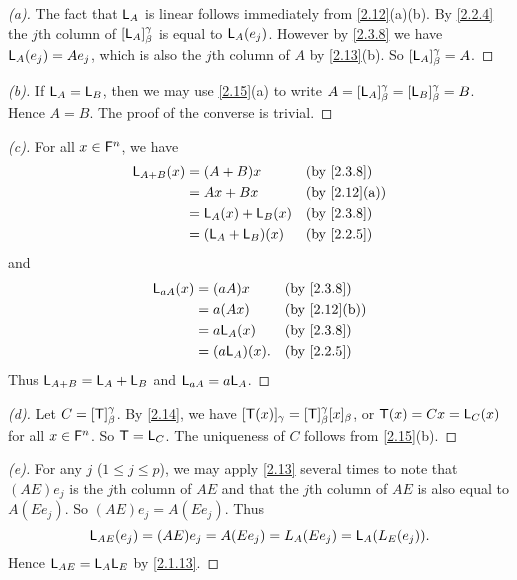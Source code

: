 \begin{proof}[(a)]
  The fact that \(\mathsf{L}_A\) is linear follows immediately from \cref{2.12}(a)(b).
  By \cref{2.2.4} the \(j\)th column of \([\mathsf{L}_A]_{\beta}^{\gamma}\) is equal to \(\mathsf{L}_A(e_j)\).
  However by \cref{2.3.8} we have \(\mathsf{L}_A(e_j) = A e_j\), which is also the \(j\)th column of \(A\) by \cref{2.13}(b).
  So \([\mathsf{L}_A]_{\beta}^{\gamma} = A\).
\end{proof}

\begin{proof}[(b)]
  If \(\mathsf{L}_A = \mathsf{L}_B\), then we may use \cref{2.15}(a) to write \(A = [\mathsf{L}_A]_{\beta}^{\gamma} = [\mathsf{L}_B]_{\beta}^{\gamma} = B\).
  Hence \(A = B\).
  The proof of the converse is trivial.
\end{proof}

\begin{proof}[(c)]
  For all \(x \in \mathsf{F}^n\), we have
  \begin{align*}
    \L_{A + B}(x) & = (A + B) x         &  & \text{(by \cref{2.3.8})}   \\
                  & = Ax + Bx           &  & \text{(by \cref{2.12}(a))} \\
                  & = \L_A(x) + \L_B(x) &  & \text{(by \cref{2.3.8})}   \\
                  & = (\L_A + \L_B)(x)  &  & \text{(by \cref{2.2.5})}
  \end{align*}
  and
  \begin{align*}
    \L_{aA}(x) & = (aA) x       &  & \text{(by \cref{2.3.8})}   \\
               & = a (Ax)       &  & \text{(by \cref{2.12}(b))} \\
               & = a \L_A(x)    &  & \text{(by \cref{2.3.8})}   \\
               & = (a \L_A)(x). &  & \text{(by \cref{2.2.5})}
  \end{align*}
  Thus \(\mathsf{L}_{A + B} = \mathsf{L}_A + \mathsf{L}_B\) and \(\mathsf{L}_{aA} = a \mathsf{L}_A\).
\end{proof}

\begin{proof}[(d)]
  Let \(C = [\mathsf{T}]_{\beta}^{\gamma}\).
  By \cref{2.14}, we have \([\mathsf{T}(x)]_{\gamma} = [\mathsf{T}]_{\beta}^{\gamma} [x]_{\beta}\), or \(\mathsf{T}(x) = Cx = \mathsf{L}_C(x)\) for all \(x \in \mathsf{F}^n\).
  So \(\mathsf{T} = \mathsf{L}_C\).
  The uniqueness of \(C\) follows from \cref{2.15}(b).
\end{proof}

\begin{proof}[(e)]
  For any \(j\) (\(1 \leq j \leq p\)), we may apply \cref{2.13} several times to note that \((AE) e_j\) is the \(j\)th column of \(AE\) and that the \(j\)th column of \(AE\) is also equal to \(A (E e_j)\).
  So \((AE) e_j = A (Ee_j)\).
  Thus
  \[
    \mathsf{L}_{AE}(e_j) = (AE) e_j = A (E e_j) = \\L_A(E e_j) = \mathsf{L}_A(L_E(e_j)).
  \]
  Hence \(\mathsf{L}_{AE} = \mathsf{L}_A \mathsf{L}_E\) by \cref{2.1.13}.
\end{proof}

